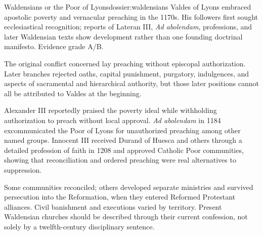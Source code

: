 \begin{heresydossier}{Waldensians or the Poor of Lyons}{dossier:waldensians}
\objectfield Valdes of Lyons embraced apostolic poverty and vernacular preaching in the 1170s. His followers first sought ecclesiastical recognition; reports of Lateran III, \emph{Ad abolendam}, professions, and later Waldensian texts show development rather than one founding doctrinal manifesto. Evidence grade A/B.

\propositionfield The original conflict concerned lay preaching without episcopal authorization. Later branches rejected oaths, capital punishment, purgatory, indulgences, and aspects of sacramental and hierarchical authority, but those later positions cannot all be attributed to Valdes at the beginning.

\responsefield Alexander III reportedly praised the poverty ideal while withholding authorization to preach without local approval. \emph{Ad abolendam} in 1184 excommunicated the Poor of Lyons for unauthorized preaching among other named groups. Innocent III received Durand of Huesca and others through a detailed profession of faith in 1208 and approved Catholic Poor communities, showing that reconciliation and ordered preaching were real alternatives to suppression.

\aftermathfield Some communities reconciled; others developed separate ministries and survived persecution into the Reformation, when they entered Reformed Protestant alliances. Civil banishment and executions varied by territory. Present Waldensian churches should be described through their current confession, not solely by a twelfth-century disciplinary sentence.
\end{heresydossier}

